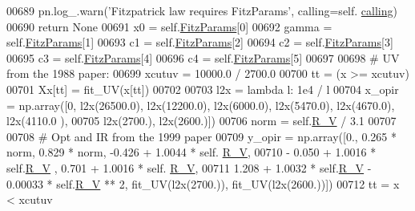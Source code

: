 \begin{DoxyVerb}
\begin{DoxyCode}
00689             pn.log\_.warn(\textcolor{stringliteral}{'Fitzpatrick law requires FitzParams'}, calling=self.
      \hyperlink{classpyneb_1_1extinction_1_1red__corr_1_1_red_corr_a30606dfd94b4cefefd10dbb1f7cbd473}{calling})
00690             \textcolor{keywordflow}{return} \textcolor{keywordtype}{None}
00691         x0 = self.\hyperlink{classpyneb_1_1extinction_1_1red__corr_1_1_red_corr_a133fcc7513d358e629266b24cbe7bebc}{FitzParams}[0]
00692         gamma = self.\hyperlink{classpyneb_1_1extinction_1_1red__corr_1_1_red_corr_a133fcc7513d358e629266b24cbe7bebc}{FitzParams}[1]
00693         c1 = self.\hyperlink{classpyneb_1_1extinction_1_1red__corr_1_1_red_corr_a133fcc7513d358e629266b24cbe7bebc}{FitzParams}[2]
00694         c2 = self.\hyperlink{classpyneb_1_1extinction_1_1red__corr_1_1_red_corr_a133fcc7513d358e629266b24cbe7bebc}{FitzParams}[3]
00695         c3 = self.\hyperlink{classpyneb_1_1extinction_1_1red__corr_1_1_red_corr_a133fcc7513d358e629266b24cbe7bebc}{FitzParams}[4]
00696         c4 = self.\hyperlink{classpyneb_1_1extinction_1_1red__corr_1_1_red_corr_a133fcc7513d358e629266b24cbe7bebc}{FitzParams}[5]
00697         
00698         \textcolor{comment}{# UV from the 1988 paper:}
00699         xcutuv = 10000.0 / 2700.0
00700         tt = (x >= xcutuv) 
00701         Xx[tt] = fit\_UV(x[tt])
00702         
00703         l2x = \textcolor{keyword}{lambda} l: 1e4 / l
00704         x\_opir = np.array([0, l2x(26500.0), l2x(12200.0), l2x(6000.0), l2x(5470.0), l2x(4670.0), l2x(4110.0
      ),
00705                   l2x(2700.), l2x(2600.)])
00706         norm = self.\hyperlink{classpyneb_1_1extinction_1_1red__corr_1_1_red_corr_a4696ecdd84c912c20e6aa19b1573e875}{R\_V} / 3.1
00707 
00708         \textcolor{comment}{# Opt and IR from the 1999 paper}
00709         y\_opir = np.array([0., 0.265 * norm, 0.829 * norm, -0.426 + 1.0044 * self.
      \hyperlink{classpyneb_1_1extinction_1_1red__corr_1_1_red_corr_a4696ecdd84c912c20e6aa19b1573e875}{R\_V},
00710                            - 0.050 + 1.0016 * self.\hyperlink{classpyneb_1_1extinction_1_1red__corr_1_1_red_corr_a4696ecdd84c912c20e6aa19b1573e875}{R\_V} , 0.701 + 1.0016 * self.
      \hyperlink{classpyneb_1_1extinction_1_1red__corr_1_1_red_corr_a4696ecdd84c912c20e6aa19b1573e875}{R\_V},
00711                            1.208 + 1.0032 * self.\hyperlink{classpyneb_1_1extinction_1_1red__corr_1_1_red_corr_a4696ecdd84c912c20e6aa19b1573e875}{R\_V} - 0.00033 * self.\hyperlink{classpyneb_1_1extinction_1_1red__corr_1_1_red_corr_a4696ecdd84c912c20e6aa19b1573e875}{R\_V} ** 2, fit\_UV(l2x(2700.)), 
      fit\_UV(l2x(2600.))])
00712         tt = x < xcutuv

\end{DoxyCode}
\end{DoxyVerb}
